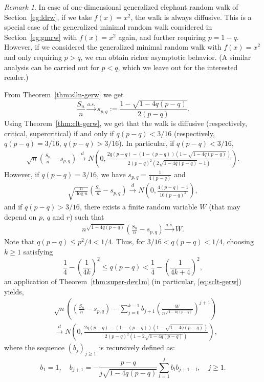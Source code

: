 \documentclass[12pt]{amsart}
\theoremstyle{plain}
\theoremstyle{remark}
\newtheorem{remark}[theorem]{Remark}
\numberwithin{equation}{section}
\begin{document}
\begin{remark}%
    {In case of one-dimensional generalized elephant random walk of Section~\ref{eg:ldrw}, if we take $f(x) = x^2$, the walk is always diffusive. This is a special case of the generalized minimal random walk considered in Section~\ref{eg:gmrw} with $f(x)=x^2$ again, and further requiring $p=1-q$. However, if we considered the generalized minimal random walk with $f(x)=x^2$ and only requiring $p>q$, we can obtain richer asymptotic behavior. (A similar analysis can be carried out for $p<q$, which we leave out for the interested reader.) 
    
    From Theorem~\ref{thm:slln-gerw} we get \[\frac{S_n}{n} \stackrel{a.s.}{\to} s_{p,q} := \frac{1-\sqrt{1-4q(p-q)}}{2(p-q)}.\] Using Theorem~\ref{thm:clt-gerw}, we get that the walk is diffusive (respectively, critical, supercritical) if and only if $q(p-q) < 3/16$ (respectively, $q(p-q) = 3/16$, $q(p-q) > 3/16$). In particular, if $q(p-q) < {3}/{16}$, 
\begin{align*}
    \sqrt{n}\left(\frac{S_n}{n} - s_{p,q}\right) \stackrel{d}{\to} N\left(0,\frac{2q(p-q) - (1-(p-q))\left(1-\sqrt{1-4q(p-q)}\right)}{2(p-q)^2\left(2\sqrt{1-4q(p-q)}-1\right)}\right).
\end{align*}
However, if $q(p-q) = 3/16$, we have $s_{p,q} = \frac1{4(p-q)}$ and
\begin{align*}
    \sqrt{\frac{n}{\log n}}\left(\frac{S_n}{n} - s_{p,q}\right) \stackrel{d}{\to} N\left(0,\frac{4(p-q)-1}{16(p-q)^2}\right),
\end{align*}
and if $q(p-q) > 3/16$, there exists a finite random variable $W$ (that may depend on $p$, $q$ and $r$) such that
\begin{align*}
    n^{{\sqrt{1-4q(p-q)}}}\left(\frac{S_n}{n} - s_{p,q}\right) \stackrel{a.s.}{\to} W.
\end{align*}
Note that $q(p-q) \le p^2/4 <1/4$. Thus, for $3/16 < q(p-q) < 1/4$, choosing $k \geq 1$ satisfying \[\frac{1}{4} - \left(\frac{1}{4k}\right)^2 \leq q(p-q) < \frac{1}{4} - \left(\frac{1}{4k+4}\right)^2,\] an application of Theorem~\ref{thm:super-dev1m} (in particular, \eqref{eq:sclt-gerw}) yields,
\begin{align*}
    &\sqrt{n}\left(\left(\frac{{S}_n}{n} - s_{p,q}\right) - \sum_{j = 0}^{k-1} b_{j+1}\left(\frac{W}{n^{{\sqrt{1-4q(p-q)}}}}\right)^{j+1}\right) \\ &\stackrel{d}{\to} N\left(0,\frac{2q(p-q) - (1-(p-q))\left(1-\sqrt{1-4q(p-q)}\right)}{2(p-q)^2\left(1-2\sqrt{1-4q(p-q)}\right)}\right),
\end{align*}
where the sequence $\left(b_j\right)_{j \geq 1}$ is recursively defined as: 
\[
   b_1 = 1, \quad b_{j+1} = -\frac{p-q}{j\sqrt{1-4q(p-q)}} \sum_{l=1}^j b_lb_{j+1-l}, \quad j \geq 1.
\]}
\end{remark}
\end{document}
